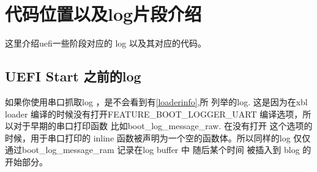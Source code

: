 \section{代码位置以及log片段介绍}

这里介绍uefi一些阶段对应的 log 以及其对应的代码。

\subsection{UEFI Start 之前的log}

如果你使用串口抓取log ，是不会看到有\ref{loaderinfo},所
列举的log. 这是因为在xbl loader 编译的时候没有打开FEATURE\_BOOT\_LOGGER\_UART
编译选项，所以对于早期的串口打印函数 比如boot\_log\_message\_raw. 在没有打开
这个选项的时候，用于串口打印的 inline 函数被声明为一个空的函数体。所以同样的log 
仅仅通过boot\_log\_message\_ram 记录在log buffer 中 随后某个时间 被插入到 blog 的
开始部分。








